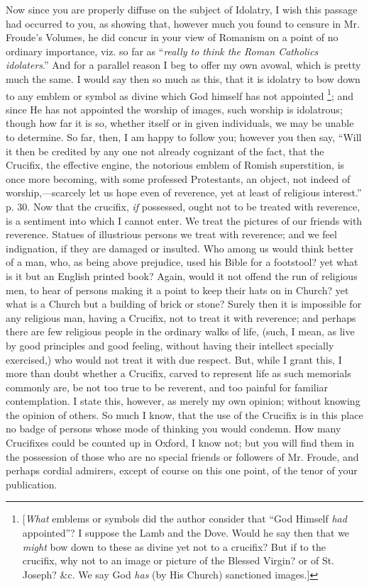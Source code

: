 Now since you are properly diffuse on the subject
of Idolatry, I wish this passage had occurred to you, as showing that,
however much you found to censure in Mr. Froude's Volumes, he did
concur in your view of Romanism on a point of no ordinary importance,
viz. so far as ``\emph{really to think the Roman Catholics idolaters}.''
And for a parallel reason I beg to offer my own avowal, which is
pretty much the same. I would say then so much as this, that it is
idolatry to bow down to any emblem or symbol as divine which God
himself has not appointed \footnote{[\emph{What} emblems or symbols did the author consider that ``God
Himself \emph{had} appointed''? I suppose the Lamb and the Dove.
Would he say then that we \emph{might} bow down to these as divine yet
not to a crucifix? But if to the crucifix, why not to an image or
picture of the Blessed Virgin? or of St. Joseph? \&c. We say God \emph{has}
(by His Church) sanctioned images.]}; and since He has not appointed
the worship of images, such worship is idolatrous; though how far it
is so, whether itself or in given individuals, we may be unable to
determine. So far, then, I am happy to follow you; however you then
say, ``Will it then be credited by any one not already cognizant of
the fact, that the Crucifix, the effective engine, the notorious
emblem of Romish superstition, is once more becoming, with some
professed Protestants, an object, not indeed of worship,—scarcely
let us hope even of reverence, yet at least of religious interest.''
p. 30. Now that the crucifix, \emph{if} possessed, ought not to be
treated with reverence, is a sentiment into which I cannot enter. We
treat the pictures of our friends with reverence. Statues of
illustrious persons we treat with reverence; and we feel indignation,
if they are damaged or insulted. Who among us would think better of a
man, who, as being above prejudice, used his Bible for a
footstool? yet what is it but an English printed book? Again, would it
not offend the run of religious men, to hear of persons making it a
point to keep their hats on in Church? yet what is a Church but a
building of brick or stone? Surely then it is impossible for any
religious man, having a Crucifix, not to treat it with reverence; and
perhaps there are few religious people in the ordinary walks of life,
(such, I mean, as live by good principles and good feeling, without
having their intellect specially exercised,) who would not treat it
with due respect. But, while I grant this, I more than doubt whether a
Crucifix, carved to represent life as such memorials commonly are, be
not too true to be reverent, and too painful for familiar
contemplation. I state this, however, as merely my own opinion;
without knowing the opinion of others. So much I know, that the use of
the Crucifix is in this place no badge of persons whose mode of
thinking you would condemn. How many Crucifixes could be counted up in
Oxford, I know not; but you will find them in the possession of those
who are no special friends or followers of Mr. Froude, and perhaps
cordial admirers, except of course on this one point, of the tenor of
your publication.


